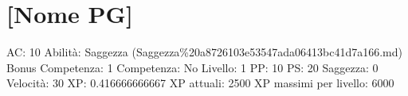 \section{{[}Nome PG{]}}\label{nome-pg}

AC: 10 Abilità: Saggezza
(Saggezza\%20a8726103e53547ada06413bc41d7a166.md) Bonus Competenza: 1
Competenza: No Livello: 1 PP: 10 PS: 20 Saggezza: 0 Velocità: 30 XP:
0.416666666667 XP attuali: 2500 XP massimi per livello: 6000
